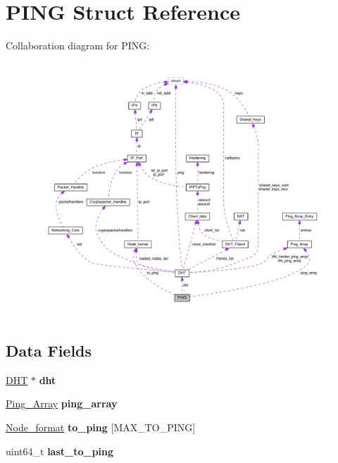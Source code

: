 \hypertarget{struct_p_i_n_g}{\section{P\+I\+N\+G Struct Reference}
\label{struct_p_i_n_g}
}


Collaboration diagram for P\+I\+N\+G\+:\nopagebreak
\begin{figure}[H]
\begin{center}
\leavevmode
\includegraphics[width=350pt]{struct_p_i_n_g__coll__graph}
\end{center}
\end{figure}
\subsection*{Data Fields}
\begin{DoxyCompactItemize}
\item 
\hypertarget{struct_p_i_n_g_a8b3d6ce8745acc52695e252bdb1531b6}{\hyperlink{struct_d_h_t}{D\+H\+T} $\ast$ {\bfseries dht}}\label{struct_p_i_n_g_a8b3d6ce8745acc52695e252bdb1531b6}

\item 
\hypertarget{struct_p_i_n_g_afb64d37a183969be553d23416dc47a4b}{\hyperlink{struct_ping___array}{Ping\+\_\+\+Array} {\bfseries ping\+\_\+array}}\label{struct_p_i_n_g_afb64d37a183969be553d23416dc47a4b}

\item 
\hypertarget{struct_p_i_n_g_a285072fd4cc519802afa28bef4227c57}{\hyperlink{struct_node__format}{Node\+\_\+format} {\bfseries to\+\_\+ping} \mbox{[}M\+A\+X\+\_\+\+T\+O\+\_\+\+P\+I\+N\+G\mbox{]}}\label{struct_p_i_n_g_a285072fd4cc519802afa28bef4227c57}

\item 
\hypertarget{struct_p_i_n_g_afc22124d671081ed5b12fc2fa71801d3}{uint64\+\_\+t {\bfseries last\+\_\+to\+\_\+ping}}\label{struct_p_i_n_g_afc22124d671081ed5b12fc2fa71801d3}

\end{DoxyCompactItemize}



